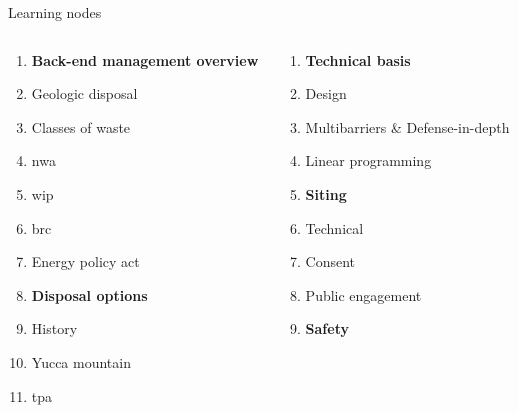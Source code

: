 \documentclass[aspectratio=1610,pdftex,dvipsnames,compress,xcolor={dvipsnames}]{beamer}
\newcommand{\acf}{\acrfull} %
\begin{document}
\begin{frame}{Learning nodes}
    \begin{columns}[t]

        \begin{column}{0.50\textwidth}
            \begin{enumerate}[series=outerlist,topsep=0pt,itemsep=1pt,leftmargin=*,label=(\arabic*)]
                \item[]\textbf{Back-end management overview}
                \item[]Geologic disposal
                \item[]Classes of waste
                \item[]\acf{nwa}
                \item[]\acf{wip}
                \item[]\acf{brc}
                \item[]Energy policy act
                    \vspace{0.15in}
                \item[]\textbf{Disposal options}
                \item[]History
                \item[]Yucca mountain
                \item[]\acf{tpa}
            \end{enumerate}
        \end{column}

        \begin{column}{0.50\textwidth}
            \begin{enumerate}[series=outerlist,topsep=0pt,itemsep=1pt,leftmargin=*,label=(\arabic*)]
                \item[]\textbf{Technical basis}
                \item[]Design
                \item[]Multibarriers \& Defense-in-depth
                \item[]Linear programming
                    \vspace{0.15in}
                \item[]\textbf{Siting}
                \item[]Technical
                \item[]Consent
                \item[]Public engagement
                    \vspace{0.15in}
                \item[]\textbf{Safety}
            \end{enumerate}
        \end{column}

    \end{columns}
\end{frame}
\end{document}

